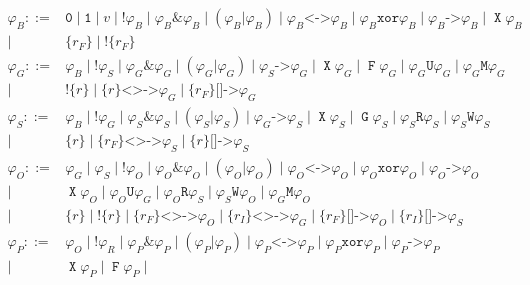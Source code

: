 \documentclass[a4paper,twoside,10pt,DIV=12]{scrreprt}
\DeclareMathOperator{\F}{\texttt{F}}
\DeclareMathOperator{\G}{\texttt{G}}
\newcommand{\U}{\mathbin{\texttt{U}}}
\newcommand{\R}{\mathbin{\texttt{R}}}
\DeclareMathOperator{\X}{\texttt{X}}
\newcommand{\M}{\mathbin{\texttt{M}}}
\newcommand{\W}{\mathbin{\texttt{W}}}
\DeclareMathOperator{\NOT}{\texttt{!}}
\newcommand{\XOR}{\mathbin{\texttt{xor}}}
\newcommand{\IMPLIES}{\mathbin{\texttt{->}}}
\newcommand{\EQUIV}{\mathbin{\texttt{<->}}}
\newcommand{\OR}{\mathbin{\texttt{|}}}
\newcommand{\AND}{\mathbin{\texttt{\&}}}
\newcommand{\0}{\texttt{0}}
\newcommand{\1}{\texttt{1}}
\newcommand{\Esuffix}{\texttt{<>->}}
\newcommand{\Asuffix}{\texttt{[]->}}
\newcommand{\sere}[1]{\texttt{\{}#1\texttt{\}}}
\newcommand{\nsere}[1]{\texttt{!\{}#1\texttt{\}}}
\begin{document}
\begin{align*}
  \varphi_B ::={}& \0\mid\1\mid v\mid\NOT\varphi_B\mid\varphi_B\AND\varphi_B
                   \mid(\varphi_B\OR\varphi_B)\mid\varphi_B\EQUIV\varphi_B
                   \mid\varphi_B\XOR\varphi_B\mid\varphi_B\IMPLIES\varphi_B
                   \mid\X\varphi_B\\
               \mid{}& \sere{r_F}\mid \nsere{r_F}\\
  \varphi_G ::={}& \varphi_B\mid \NOT\varphi_S\mid
                   \varphi_G\AND \varphi_G\mid (\varphi_G\OR \varphi_G)
                   \mid\varphi_S\IMPLIES\varphi_G\mid
                   \X\varphi_G \mid \F\varphi_G\mid
                   \varphi_G\U\varphi_G\mid \varphi_G\M\varphi_G\\
           \mid{}& \nsere{r}\mid
                   \sere{r}\Esuffix \varphi_G\mid
                   \sere{r_F}\Asuffix \varphi_G \\
  \varphi_S ::={}& \varphi_B\mid \NOT\varphi_G\mid
                   \varphi_S\AND \varphi_S\mid (\varphi_S\OR \varphi_S)
                   \mid\varphi_G\IMPLIES\varphi_S\mid
                   \X\varphi_S \mid \G\varphi_S\mid
                   \varphi_S\R\varphi_S\mid \varphi_S\W\varphi_S\\
           \mid{}& \sere{r}\mid
                   \sere{r_F}\Esuffix \varphi_S\mid
                   \sere{r}\Asuffix \varphi_S\\
  \varphi_O ::={}& \varphi_G \mid \varphi_S\mid \NOT\varphi_O\mid
                   \varphi_O\AND \varphi_O\mid (\varphi_O\OR \varphi_O)\mid
                   \varphi_O\EQUIV \varphi_O\mid \varphi_O\XOR \varphi_O\mid
                   \varphi_O\IMPLIES \varphi_O\\
           \mid{}& \X\varphi_O \mid
                   \varphi_O\U\varphi_G\mid\varphi_O\R\varphi_S \mid
                   \varphi_S\W\varphi_O\mid \varphi_G\M\varphi_O\\
           \mid{}& \sere{r} \mid \nsere{r}\mid
                   \sere{r_F}\Esuffix \varphi_O \mid \sere{r_I}\Esuffix \varphi_G\mid
                   \sere{r_F}\Asuffix \varphi_O\mid
                   \sere{r_I}\Asuffix \varphi_S\\
  \varphi_P ::={}& \varphi_O \mid \NOT\varphi_R\mid
                   \varphi_P\AND \varphi_P\mid (\varphi_P\OR \varphi_P)\mid
                   \varphi_P\EQUIV \varphi_P\mid \varphi_P\XOR \varphi_P\mid
                   \varphi_P\IMPLIES \varphi_P\\
           \mid{}& \X\varphi_P \mid \F\varphi_P \mid

\end{align*}
\end{document}
